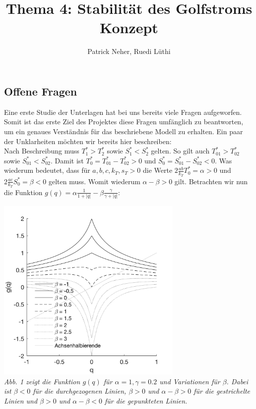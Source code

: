 \documentclass[11pt,a4paper]{article}
\author{Patrick Neher, Ruedi Lüthi}
\title{Thema 4: Stabilität des Golfstroms \\ \textbf{Konzept} }
\begin{document}
	\maketitle

	\subsection*{Offene Fragen}

	Eine erste Studie der Unterlagen hat bei uns bereits viele Fragen aufgeworfen. Somit ist das erste Ziel des Projektes diese Fragen umfänglich zu beantworten, um ein genaues Verständnis für das beschriebene Modell zu erhalten. Ein paar der Unklarheiten möchten wir bereits hier beschreiben:\\
	
	Nach Beschreibung muss \(T^*_1 > T^*_2\) sowie \(S^*_1 < S^*_2\) gelten. So gilt auch \(T^*_{01} > T^*_{02}\) sowie \(S^*_{01} < S^*_{02}\). Damit ist \(T^*_0 = T^*_{01} - T^*_{02} > 0\) und \(S^*_0 = S^*_{01} - S^*_{02} < 0\). Was wiederum bedeutet, dass für \(a, b, c, k_T, s_T > 0\) die Werte \(2\frac{ab}{k_T}T^*_0 = \alpha > 0\) und  \(2\frac{ac}{k_T}S^*_0 = \beta < 0\) gelten muss. Womit wiederum \(\alpha - \beta > 0\) gilt. Betrachten wir nun die Funktion \(g(q) = \alpha \frac{1}{1+|q|} - \beta \frac{\gamma}{\gamma + |q|} \):

	\begin{center}
	\includegraphics[width=9cm]{Diagramme/g_von_q.png} \\
	\textit{Abb. 1 zeigt die Funktion \(g(q)\) für \(\alpha = 1, \gamma = 0.2\) und Variationen für \(\beta\). Dabei ist \(\beta < 0\) für die durchgezogenen Linien, \(\beta > 0\) und \(\alpha - \beta > 0\) für die gestrichelte Linien und \(\beta > 0\) und \(\alpha - \beta < 0\) für die gepunkteten Linien.}
	\end{center}
	
\end{document}
